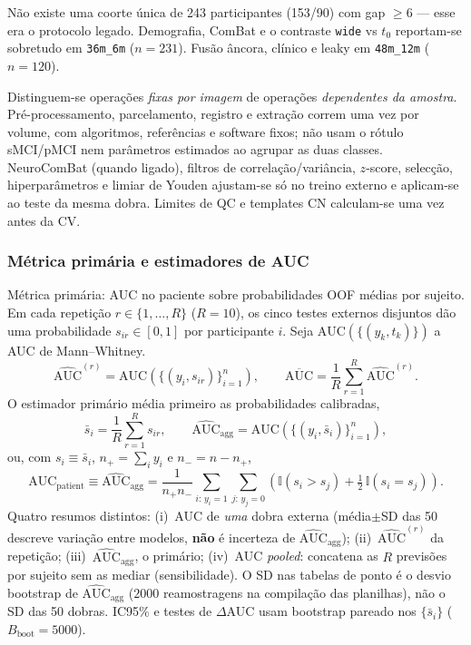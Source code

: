 \documentclass[review]{elsarticle}
\newcommand{\code}[1]{\texttt{#1}}
\begin{document}
	Não existe uma coorte única de 243 participantes (153/90) com gap $\ge 6$ --- esse era o protocolo legado.
	Demografia, ComBat e o contraste \code{wide} vs $t_0$ reportam-se sobretudo em \code{36m\_6m} ($n=231$).
	Fusão âncora, clínico e leaky em \code{48m\_12m} ($n=120$).
	
	Distinguem-se operações \emph{fixas por imagem} de operações \emph{dependentes da amostra}.
	Pré-processamento, parcelamento, registro e extração correm uma vez por volume, com algoritmos, referências e software fixos; não usam o rótulo sMCI/pMCI nem parâmetros estimados ao agrupar as duas classes.
	NeuroComBat (quando ligado), filtros de correlação/variância, $z$-score, selecção, hiperparâmetros e limiar de Youden ajustam-se só no treino externo e aplicam-se ao teste da mesma dobra.
	Limites de QC e templates CN calculam-se uma vez antes da CV.
	
	\subsubsection{Métrica primária e estimadores de AUC}
	\label{subsubsec:evaluation-metrics}
	
	Métrica primária: AUC no paciente sobre probabilidades OOF médias por sujeito.
	Em cada repetição $r\in\{1,\ldots,R\}$ ($R=10$), os cinco testes externos disjuntos dão uma probabilidade $s_{ir}\in[0,1]$ por participante $i$.
	Seja $\mathrm{AUC}(\{(y_k,t_k)\})$ a AUC de Mann--Whitney.
	\begin{equation}
		\widehat{\mathrm{AUC}}^{(r)}
		=
		\mathrm{AUC}\!\left(\{(y_i,s_{ir})\}_{i=1}^{n}\right),
		\qquad
		\overline{\mathrm{AUC}}
		=
		\frac{1}{R}\sum_{r=1}^{R}\widehat{\mathrm{AUC}}^{(r)}.
		\label{eq:auc-mean-rep}
	\end{equation}
	O estimador primário média primeiro as probabilidades calibradas,
	\begin{equation}
		\bar{s}_i
		=
		\frac{1}{R}\sum_{r=1}^{R}s_{ir},
		\qquad
		\widehat{\mathrm{AUC}}_{\mathrm{agg}}
		=
		\mathrm{AUC}\!\left(\{(y_i,\bar{s}_i)\}_{i=1}^{n}\right),
		\label{eq:auc-agg}
	\end{equation}
	ou, com $s_i\equiv\bar{s}_i$, $n_+=\sum_i y_i$ e $n_-=n-n_+$,
	\begin{equation}
		\mathrm{AUC}_{\mathrm{patient}}
		\equiv
		\widehat{\mathrm{AUC}}_{\mathrm{agg}}
		= \frac{1}{n_+ n_-}
		\sum_{i:\,y_i=1} \sum_{j:\,y_j=0}
		\left(
		\mathbb{I}(s_i > s_j)
		+ \tfrac{1}{2}\,\mathbb{I}(s_i = s_j)
		\right).
		\label{eq:auc-pooled}
	\end{equation}
	Quatro resumos distintos: (i)~AUC de \emph{uma} dobra externa (média$\pm$SD das 50 descreve variação entre modelos, \textbf{não} é incerteza de $\widehat{\mathrm{AUC}}_{\mathrm{agg}}$);
	(ii)~$\widehat{\mathrm{AUC}}^{(r)}$ da repetição;
	(iii)~$\widehat{\mathrm{AUC}}_{\mathrm{agg}}$, o primário;
	(iv)~AUC \emph{pooled}: concatena as $R$ previsões por sujeito sem as mediar (sensibilidade).
	O SD nas tabelas de ponto é o desvio bootstrap de $\widehat{\mathrm{AUC}}_{\mathrm{agg}}$ ($2000$ reamostragens na compilação das planilhas), não o SD das 50 dobras.
	IC95\% e testes de $\Delta$AUC usam bootstrap pareado nos $\{\bar{s}_i\}$ ($B_{\mathrm{boot}}=5000$).
	
\end{document}
